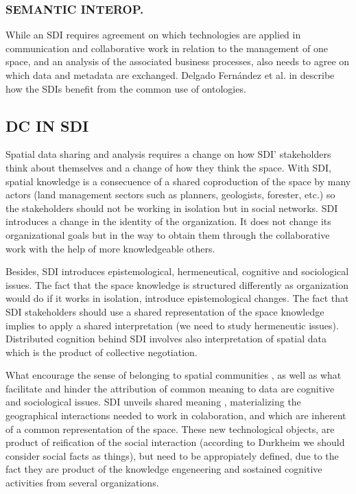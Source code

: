 \documentclass[10pt,twocolumn,ieeetran]{article}
\begin{document}
\subsubsection{SEMANTIC INTEROP.}
While an SDI requires agreement on which technologies are applied in communication and collaborative work in relation to the management of one space, and an analysis of the associated business processes, also needs to agree on which data and metadata are exchanged. Delgado Fern\' andez et al. in \cite{Delgado} describe how the SDIs benefit from the common use of ontologies. 



\subsection{DC IN SDI}

Spatial data sharing and analysis requires a change on how SDI' stakeholders think about themselves and a change of how they think the space. With SDI, spatial knowledge is a consecuence of a shared
coproduction of the space by many actors (land management sectors such as planners, geologists, forester, etc.) so the stakeholders should not be working in isolation but in social networks. SDI introduces a change
in the identity of the organization. It does not change its organizational goals but in the way to obtain them through the collaborative work with the help of more knowledgeable others.

Besides, SDI introduces epistemological, hermeneutical, cognitive and sociological issues. The fact that the space knowledge is structured differently as organization would do if it works in isolation, introduce epistemological changes. The fact that SDI stakeholders should use a shared representation of the space knowledge implies to apply a shared interpretation (we need to study hermeneutic issues). Distributed cognition behind SDI involves also interpretation of spatial data which is the product of collective negotiation. 

What encourage the sense of belonging to spatial communities \cite{Noucher2}, as well as what facilitate and hinder the attribution of common meaning to data \cite{Noucher1} are cognitive and sociological issues. 
SDI unveils shared meaning \cite{Noucher1}, materializing the geographical interactions needed to work in colaboration, and which are inherent of a common representation of the space. 
These new technological objects, are product of reification of the social interaction (according to Durkheim \cite{Durkheim} we should consider social facts as things), but need to be appropiately defined, due to the fact they are product of the knowledge engeneering and sostained cognitive activities from several organizations. 
\end{document}

